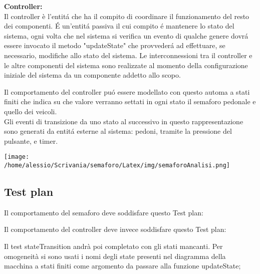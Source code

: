 \documentclass{llncs}
\begin{document}
\textbf{Controller:}\\
Il controller è l'entit\'a che ha il compito di coordinare il funzionamento del resto dei componenti. \'E un'entit\'a passiva il cui compito \'e mantenere lo stato del sistema, ogni volta che nel sistema si verifica un evento di qualche genere dovr\'a essere invocato il metodo "updateState" che provveder\'a ad effettuare, se necessario, modifiche allo stato del sistema. Le interconnessioni tra il controller e le altre componenti del sistema sono realizzate al momento della configurazione iniziale del sistema da un componente addetto allo scopo.


Il comportamento del controller pu\'o essere modellato con questo automa a stati finiti che indica su che valore verranno settati in ogni stato il semaforo pedonale e quello dei veicoli. \\
Gli eventi di transizione da uno stato al successivo in questo rappresentazione sono generati da entit\'a esterne al sistema: pedoni, tramite la pressione del pulsante, e timer.
	\begin{center}
		\texttt{[image: /home/alessio/Scrivania/semaforo/Latex/img/semaforoAnalisi.png]}
		\label{fig:ASF che rappresenta il sistema}
	\end{center}




\subsection{Test plan}
Il comportamento del semaforo deve soddisfare questo Test plan:


Il comportamento del controller deve invece soddisfare questo Test plan:


Il test stateTransition andrà poi completato con gli stati mancanti. Per omogeneità si sono usati i nomi degli state presenti nel diagramma della macchina a stati finiti come argomento da passare alla funzione updateState;
\end{document}
